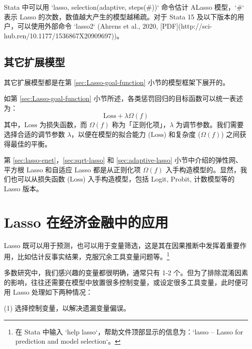 Stata 中可以用 `lasso, selection(adaptive, steps(\#))` 命令估计 ALasso 模型，`\#` 表示 Lasso 的次数，数值越大产生的模型越稀疏。对于 Stata 15 及以下版本的用户，可以使用外部命令 `lasso2` (Ahrens et al., 2020, [PDF](http://sci-hub.ren/10.1177/1536867X20909697))。



\subsection{其它扩展模型}

其它扩展模型都是在第 \ref{sec:Lasso-goal-function} 小节的模型框架下展开的。

如第 \ref{sec:Lasso-goal-function} 小节所述，各类惩罚回归的目标函数可以统一表述为：
\begin{equation}\label{eq:Lasso-08-a}
	\text{Loss}+\lambda \Omega(f)
\end{equation}
其中，$\text{Loss}$ 为损失函数，而 $\Omega(f)$ 称为「正则化项」，$\lambda$ 为调节参数。我们需要选择合适的调节参数 $\lambda$，以便在模型的拟合能力 ($\text{Loss}$) 和复杂度 ($\Omega(f)$) 之间获得最佳的平衡。

第 \ref{sec:lasso-enet}，\ref{sec:sqrt-lasso} 和  \ref{sec:adaptive-lasso} 小节中介绍的弹性网、平方根 Lasso 和自适应 Lasso 都是从正则化项 $\Omega(f)$ 入手构造模型的。显然，我们也可以从损失函数 ($\text{Loss}$) 入手构造模型，包括 Logit, Probit, 计数模型等的 Lasso 版本。 





\section{Lasso 在经济金融中的应用}\label{sec:lassoApp}
Lasso 既可以用于预测，也可以用于变量筛选，这是其在因果推断中发挥着重要作用，比如估计反事实结果，克服冗余工具变量问题等。\footnote{%
    在 Stata 中输入 `help lasso`，帮助文件顶部显示的信息为：`lasso -- Lasso for prediction and model selection`。}

多数研究中，我们感兴趣的变量都很明确，通常只有 1-2 个。但为了排除混淆因素的影响，往往还需要在模型中放置很多控制变量，或设定很多工具变量，此时便可用 Lasso 处理如下两种情况：

\vspace{5pt}
(1) 选择控制变量，以解决遗漏变量偏误。

